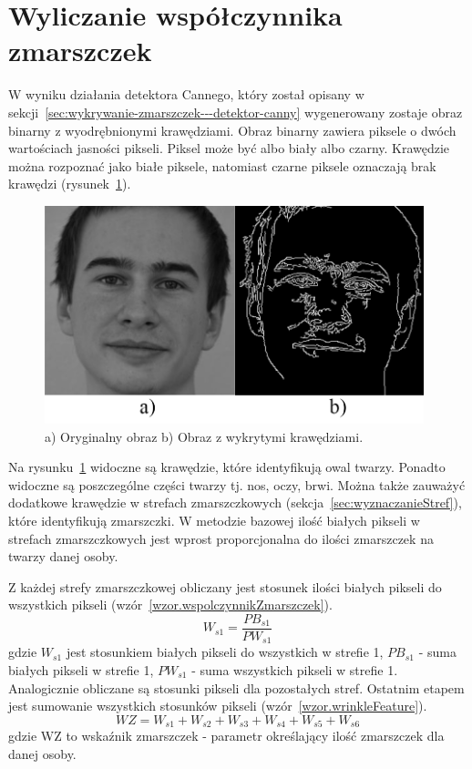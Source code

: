 \documentclass[a4paper,twoside,12pt]{book}
\begin{document}
    \section{Wyliczanie współczynnika zmarszczek}\label{sec:wyliczanieWrinkleFeature}
    W wyniku działania detektora Cannego, który został opisany w sekcji~\ref{sec:wykrywanie-zmarszczek---detektor-canny}
    wygenerowany zostaje obraz binarny z wyodrębnionymi krawędziami.
    Obraz binarny zawiera piksele o dwóch wartościach jasności pikseli.
    Piksel może być albo biały albo czarny.
    Krawędzie można rozpoznać jako białe piksele, natomiast czarne piksele oznaczają brak krawędzi (rysunek~\ref{fig.mojaTwarzGray}).

    \begin{figure}[h!]
        \centering
        \includegraphics[width=11cm]{Obrazy/mojaTwarzGray.jpg}
        \caption{a) Oryginalny obraz b) Obraz z wykrytymi krawędziami.} %
        \label{fig.mojaTwarzGray}
    \end{figure}

    Na rysunku~\ref{fig.mojaTwarzGray} widoczne są krawędzie, które identyfikują owal twarzy.
    Ponadto widoczne są poszczególne części twarzy tj. nos, oczy, brwi.
    Można także zauważyć dodatkowe krawędzie w strefach zmarszczkowych (sekcja~\ref{sec:wyznaczanieStref}),
    które identyfikują zmarszczki.
    W metodzie bazowej ilość białych pikseli w strefach zmarszczkowych jest wprost proporcjonalna do ilości zmarszczek
    na twarzy danej osoby.

    Z każdej strefy zmarszczkowej obliczany jest stosunek ilości białych pikseli do wszystkich
    pikseli (wzór~\ref{wzor.wspolczynnikZmarszczek}).
    \large
    \begin{equation}
        W_{s1} = \frac{PB_{s1}}{PW_{s1}}
        \label{wzor.wspolczynnikZmarszczek}
    \end{equation}
    \normalsize
    gdzie $W_{s1}$ jest stosunkiem białych pikseli do wszystkich w strefie 1,
    $PB_{s1}$ - suma białych pikseli w strefie 1, $PW_{s1}$ - suma wszystkich pikseli w strefie 1.
    Analogicznie obliczane są stosunki pikseli dla pozostałych stref.
    Ostatnim etapem jest sumowanie wszystkich stosunków pikseli (wzór~\ref{wzor.wrinkleFeature}).
    \large
    \begin{equation}
        WZ = W_{s1} + W_{s2} + W_{s3} + W_{s4} + W_{s5} + W_{s6}
        \label{wzor.wrinkleFeature}
    \end{equation}
    \normalsize
    gdzie WZ to wskaźnik zmarszczek - parametr określający ilość zmarszczek dla danej osoby.
\end{document}
